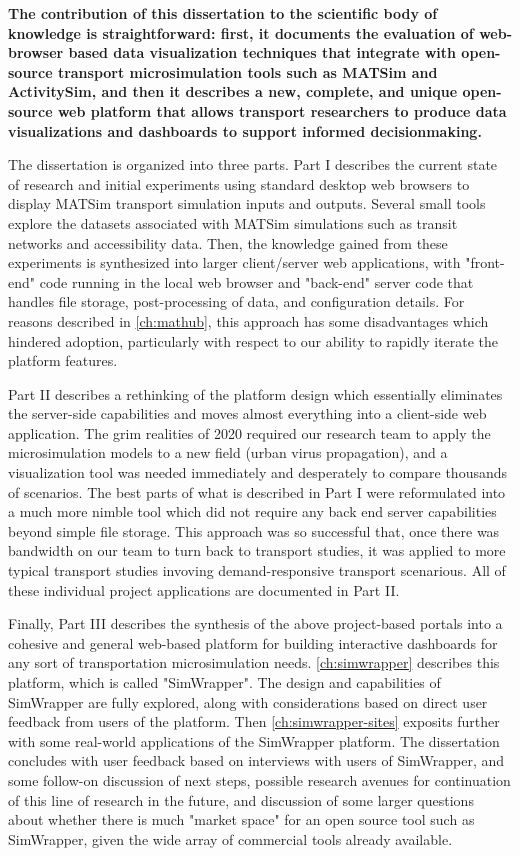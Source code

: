 \textbf{The contribution of this dissertation to the scientific body of knowledge is straightforward: first, it documents the evaluation of web-browser based data visualization techniques that integrate with open-source transport microsimulation tools such as MATSim and ActivitySim, and then it describes a new, complete, and unique open-source web platform that allows transport researchers to produce data visualizations and dashboards to support informed decisionmaking.}

The dissertation is organized into three parts. Part I describes the current state of research and initial experiments using standard desktop web browsers to display MATSim transport simulation inputs and outputs. Several small tools explore the datasets associated with MATSim simulations such as transit networks and accessibility data. Then, the knowledge gained from these experiments is synthesized into larger client/server web applications, with "front-end" code running in the local web browser and "back-end" server code that handles file storage, post-processing of data, and configuration details. For reasons described in \ref{ch:mathub}, this approach has some disadvantages which hindered adoption, particularly with respect to our ability to rapidly iterate the platform features.

Part II describes a rethinking of the platform design which essentially eliminates the server-side capabilities and moves almost everything into a client-side web application. The grim realities of 2020 required our research team to apply the microsimulation models to a new field (urban virus propagation), and a visualization tool was needed immediately and desperately to compare thousands of scenarios. The best parts of what is described in Part I were reformulated into a much more nimble tool which did not require any back end server capabilities beyond simple file storage. This approach was so successful that, once there was bandwidth on our team to turn back to transport studies, it was applied to more typical transport studies invoving demand-responsive transport scenarious. All of these individual project applications are documented in Part II.

Finally, Part III describes the synthesis of the above project-based portals into a cohesive and general web-based platform for building interactive dashboards for any sort of transportation microsimulation needs. \ref{ch:simwrapper} describes this platform, which is called "SimWrapper". The design and capabilities of SimWrapper are fully explored, along with considerations based on direct user feedback from users of the platform. Then \ref{ch:simwrapper-sites} exposits further with some real-world applications of the SimWrapper platform. The dissertation concludes with user feedback based on interviews with users of SimWrapper, and some follow-on discussion of next steps, possible research avenues for continuation of this line of research in the future, and discussion of some larger questions about whether there is much "market space" for an open source tool such as SimWrapper, given the wide array of commercial tools already available.

